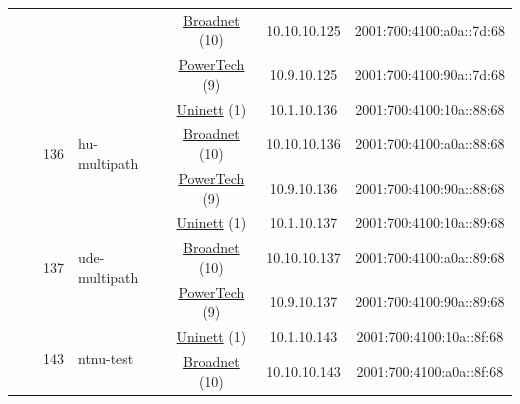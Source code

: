 \begin{small}
\begin{center}
\begin{longtable}{|c|c|c|c|c|c|c|c|}
  &  &  &  & \multicolumn{2}{|c|}{\tiny{\href{https://www.broadnet.no}{Broadnet} (10)}} & \tiny{10.10.10.125} & \tiny{2001:700:4100:a0a::7d:68} \\* \cline{5-5}\cline{6-6}\cline{7-7}\cline{8-8}
  &  &  &  & \multicolumn{2}{|c|}{\tiny{\href{http://www.powertech.no}{PowerTech} (9)}} & \tiny{10.9.10.125} & \tiny{2001:700:4100:90a::7d:68} \\* \cline{3-3}\cline{4-4}\cline{5-5}\cline{6-6}\cline{7-7}\cline{8-8}
  &  & \multirow{3}{*}{\tiny{136}} & \multicolumn{1}{|l|}{\multirow{3}{*}{\tiny{hu-multipath}}} & \multicolumn{2}{|c|}{\tiny{\href{https://www.uninett.no}{Uninett} (1)}} & \tiny{10.1.10.136} & \tiny{2001:700:4100:10a::88:68} \\* \cline{5-5}\cline{6-6}\cline{7-7}\cline{8-8}
  &  &  &  & \multicolumn{2}{|c|}{\tiny{\href{https://www.broadnet.no}{Broadnet} (10)}} & \tiny{10.10.10.136} & \tiny{2001:700:4100:a0a::88:68} \\* \cline{5-5}\cline{6-6}\cline{7-7}\cline{8-8}
  &  &  &  & \multicolumn{2}{|c|}{\tiny{\href{http://www.powertech.no}{PowerTech} (9)}} & \tiny{10.9.10.136} & \tiny{2001:700:4100:90a::88:68} \\* \cline{3-3}\cline{4-4}\cline{5-5}\cline{6-6}\cline{7-7}\cline{8-8}
  &  & \multirow{3}{*}{\tiny{137}} & \multicolumn{1}{|l|}{\multirow{3}{*}{\tiny{ude-multipath}}} & \multicolumn{2}{|c|}{\tiny{\href{https://www.uninett.no}{Uninett} (1)}} & \tiny{10.1.10.137} & \tiny{2001:700:4100:10a::89:68} \\* \cline{5-5}\cline{6-6}\cline{7-7}\cline{8-8}
  &  &  &  & \multicolumn{2}{|c|}{\tiny{\href{https://www.broadnet.no}{Broadnet} (10)}} & \tiny{10.10.10.137} & \tiny{2001:700:4100:a0a::89:68} \\* \cline{5-5}\cline{6-6}\cline{7-7}\cline{8-8}
  &  &  &  & \multicolumn{2}{|c|}{\tiny{\href{http://www.powertech.no}{PowerTech} (9)}} & \tiny{10.9.10.137} & \tiny{2001:700:4100:90a::89:68} \\* \cline{3-3}\cline{4-4}\cline{5-5}\cline{6-6}\cline{7-7}\cline{8-8}
  &  & \multirow{3}{*}{\tiny{143}} & \multicolumn{1}{|l|}{\multirow{3}{*}{\tiny{ntnu-test}}} & \multicolumn{2}{|c|}{\tiny{\href{https://www.uninett.no}{Uninett} (1)}} & \tiny{10.1.10.143} & \tiny{2001:700:4100:10a::8f:68} \\* \cline{5-5}\cline{6-6}\cline{7-7}\cline{8-8}
  &  &  &  & \multicolumn{2}{|c|}{\tiny{\href{https://www.broadnet.no}{Broadnet} (10)}} & \tiny{10.10.10.143} & \tiny{2001:700:4100:a0a::8f:68} \\* \cline{5-5}\cline{6-6}\cline{7-7}\cline{8-8}

\end{longtable}
\end{center}
\end{small}
